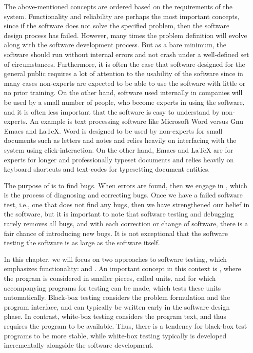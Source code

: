 The above-mentioned concepts are ordered based on the requirements of the system. Functionality and reliability are perhaps the most important concepts, since if the software does not solve the specified problem, then the software design process has failed. However, many times the problem definition will evolve along with the software development process. But as a bare minimum, the software should run without internal errors and not crash under a well-defined set of circumstances. Furthermore, it is often the case that software designed for the general public requires a lot of attention to the usability of the software since in many cases non-experts are expected to be able to use the software with little or no prior training. On the other hand, software used internally in companies will be used by a small number of people, who become experts in using the software, and it is often less important that the software is easy to understand by non-experts. An example is text processing software like Microsoft Word versus Gnu Emacs and LaTeX. Word is designed to be used by non-experts for small documents such as letters and notes and relies heavily on interfacing with the system using click-interaction. On the other hand, Emacs and LaTeX are for experts for longer and professionally typeset documents and relies heavily on keyboard shortcuts and text-codes for typesetting document entities. 

The purpose of  is to find bugs. When errors are found, then we engage in , which is the process of diagnosing and correcting bugs. Once we have a failed software test, i.e., one that does not find any bugs, then we have strengthened our belief in the software, but it is important to note that software testing and debugging rarely removes all bugs, and with each correction or change of software, there is a fair chance of introducing new bugs. It is not exceptional that the software testing the software is as large as the software itself.

In this chapter, we will focus on two approaches to software testing, which emphasizes functionality:  and . An important concept in this context is , where the program is considered in smaller pieces, called units, and for which accompanying programs for testing can be made, which tests these units automatically. Black-box testing considers the problem formulation and the program interface, and can typically be written early in the software design phase. In contrast, white-box testing considers the program text, and thus requires the program to be available. Thus, there is a tendency for black-box test programs to be more stable, while white-box testing typically is developed incrementally alongside the software development.

